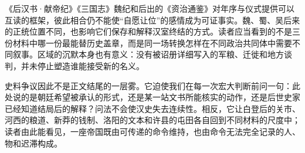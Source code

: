 《后汉书·献帝纪》《三国志》魏纪和后出的《资治通鉴》对年序与仪式提供可以互读的框架，彼此相合仍不能使“自愿让位”的感情成为可证事实。魏、蜀、吴后来的正统位置不同，也影响它们保存和解释汉室终结的方式。读者应当看到的不是三份材料中哪一份最能替历史盖章，而是同一场转换怎样在不同政治共同体中需要不同叙事。区域的沉默本身也有意义：没有被诏册详细写入的军粮、迁徙和地方谈判，并未停止塑造谁能接受新的名义。

史料争议因此不是正文结尾的一层雾。它迫使我们在每一次宏大判断前问一句：此处说的是朝廷希望被承认的形式，还是某一站文书所能核实的动作，还是后世史家已经知道结局后的解释？问法不会使汉史失去连续性。相反，它让白登后的关市、河西的粮道、新莽的钱制、洛阳的文本和许县的屯田各自回到不同材料的尺度中；读者由此能看见，一座帝国既由可传递的命令维持，也由命令无法完全记录的人、物和迟滞构成。
